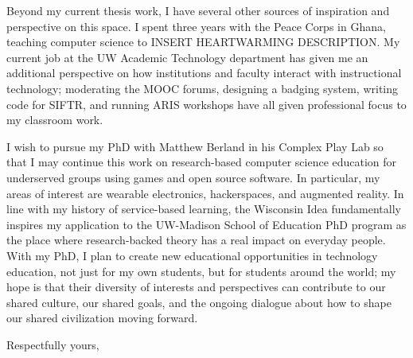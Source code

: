 \documentclass[12pt]{letter}
\begin{document}
\begin{letter}
Beyond my current thesis work, I have several other sources of inspiration and perspective on this space. I spent three years with the Peace Corps in Ghana, teaching computer science to INSERT HEARTWARMING DESCRIPTION. My current job at the UW Academic Technology department has given me an additional perspective on how institutions and faculty interact with instructional technology; moderating the MOOC forums, designing a badging system, writing code for SIFTR, and running ARIS workshops have all given professional focus to my classroom work.

I wish to pursue my PhD with Matthew Berland in his Complex Play Lab so that I may continue this work on research-based computer science education for underserved groups using games and open source software. In particular, my areas of interest are wearable electronics, hackerspaces, and augmented reality. In line with my history of service-based learning, the Wisconsin Idea fundamentally inspires my application to the UW-Madison School of Education PhD program as the place where research-backed theory has a real impact on everyday people. With my PhD, I plan to create new educational opportunities in technology education, not just for my own students, but for students around the world; my hope is that their diversity of interests and perspectives can contribute to our shared culture, our shared goals, and the ongoing dialogue about how to shape our shared civilization moving forward.

\closing{Respectfully yours,}

\end{letter}
\end{document}
